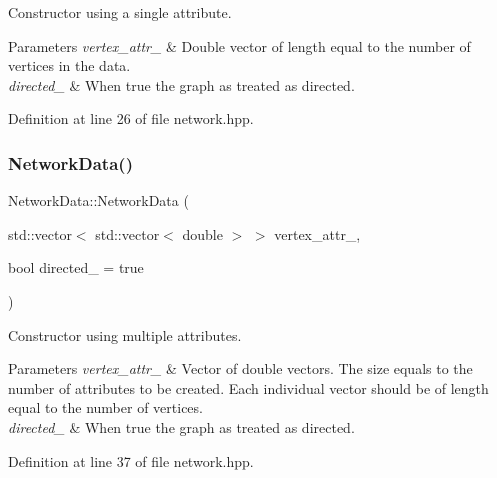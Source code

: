 Constructor using a single attribute. 


\begin{DoxyParams}{Parameters}
{\em vertex\+\_\+attr\+\_\+} & Double vector of length equal to the number of vertices in the data. \\
\hline
{\em directed\+\_\+} & When {\ttfamily true} the graph as treated as directed. \\
\hline
\end{DoxyParams}


Definition at line 26 of file network.\+hpp.

\mbox{\label{class_network_data_ac4b5a740d40bc84695653c3e3499ac65}} 
\subsubsection{\texorpdfstring{Network\+Data()}{NetworkData()}\hspace{0.1cm}{\footnotesize\ttfamily [3/3]}}
{\footnotesize\ttfamily Network\+Data\+::\+Network\+Data (\begin{DoxyParamCaption}\item[{std\+::vector$<$ std\+::vector$<$ double $>$ $>$}]{vertex\+\_\+attr\+\_\+,  }\item[{bool}]{directed\+\_\+ = {\ttfamily true} }\end{DoxyParamCaption})\hspace{0.3cm}{\ttfamily [inline]}}



Constructor using multiple attributes. 


\begin{DoxyParams}{Parameters}
{\em vertex\+\_\+attr\+\_\+} & Vector of double vectors. The size equals to the number of attributes to be created. Each individual vector should be of length equal to the number of vertices. \\
\hline
{\em directed\+\_\+} & When {\ttfamily true} the graph as treated as directed. \\
\hline
\end{DoxyParams}


Definition at line 37 of file network.\+hpp.

\mbox{\label{class_network_data_a4667137d76017d3c69a789ad6cf86931}} 
